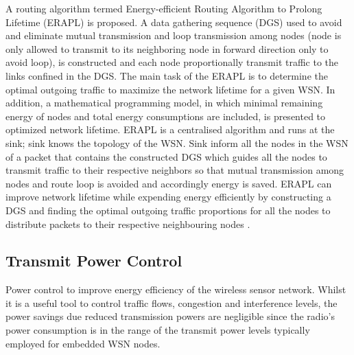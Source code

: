 A routing algorithm termed Energy-efficient Routing Algorithm to Prolong Lifetime (ERAPL) is proposed. A data gathering sequence (DGS) used to avoid and eliminate mutual transmission and loop transmission among nodes (node is only allowed to transmit to its neighboring node in forward direction only to avoid loop), is constructed and each node proportionally transmit traffic to the links confined in the DGS. The main task of the ERAPL is to determine the optimal outgoing traffic to maximize the network lifetime for a given WSN. In addition, a mathematical programming model, in which minimal remaining energy of nodes and total energy consumptions are included, is presented to optimized network lifetime. ERAPL is a centralised algorithm and runs at the sink; sink knows the topology of the WSN. Sink inform all the nodes in the WSN of a packet that contains the constructed DGS which guides all the nodes to transmit traffic to their respective neighbors so that mutual transmission among nodes and route loop is avoided and accordingly energy is saved. ERAPL can improve network lifetime while expending energy efficiently by constructing a DGS and finding the optimal outgoing traffic proportions for all the nodes to distribute packets to their respective neighbouring nodes \cite{erapl}. 

\subsection{Transmit Power Control}
Power control to improve energy efficiency of the wireless sensor network. Whilst it is a useful tool to control traffic flows, congestion and interference levels, the power savings due reduced transmission powers are negligible since the radio's power consumption is in the range of the transmit power levels typically employed for embedded WSN nodes. \cite{macsurvey}

